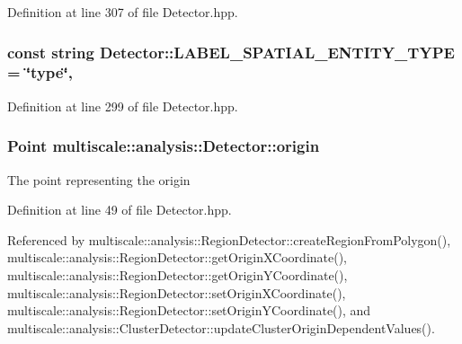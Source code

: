 Definition at line 307 of file Detector.\-hpp.

\hypertarget{classmultiscale_1_1analysis_1_1Detector_ac93f1fd6bdc7250b890480c7d5acf5b0}{
\subsubsection[{L\-A\-B\-E\-L\-\_\-\-S\-P\-A\-T\-I\-A\-L\-\_\-\-E\-N\-T\-I\-T\-Y\-\_\-\-T\-Y\-P\-E}]{\setlength{\rightskip}{0pt plus 5cm}const string Detector\-::\-L\-A\-B\-E\-L\-\_\-\-S\-P\-A\-T\-I\-A\-L\-\_\-\-E\-N\-T\-I\-T\-Y\-\_\-\-T\-Y\-P\-E = \char`\"{}type\char`\"{}\hspace{0.3cm}{\ttfamily [static]}, {\ttfamily [protected]}}}\label{classmultiscale_1_1analysis_1_1Detector_ac93f1fd6bdc7250b890480c7d5acf5b0}


Definition at line 299 of file Detector.\-hpp.

\hypertarget{classmultiscale_1_1analysis_1_1Detector_a002237e2ad684975a7c8b1e12dd7d780}{
\subsubsection[{origin}]{\setlength{\rightskip}{0pt plus 5cm}Point multiscale\-::analysis\-::\-Detector\-::origin\hspace{0.3cm}{\ttfamily [protected]}}}\label{classmultiscale_1_1analysis_1_1Detector_a002237e2ad684975a7c8b1e12dd7d780}
The point representing the origin 

Definition at line 49 of file Detector.\-hpp.



Referenced by multiscale\-::analysis\-::\-Region\-Detector\-::create\-Region\-From\-Polygon(), multiscale\-::analysis\-::\-Region\-Detector\-::get\-Origin\-X\-Coordinate(), multiscale\-::analysis\-::\-Region\-Detector\-::get\-Origin\-Y\-Coordinate(), multiscale\-::analysis\-::\-Region\-Detector\-::set\-Origin\-X\-Coordinate(), multiscale\-::analysis\-::\-Region\-Detector\-::set\-Origin\-Y\-Coordinate(), and multiscale\-::analysis\-::\-Cluster\-Detector\-::update\-Cluster\-Origin\-Dependent\-Values().

